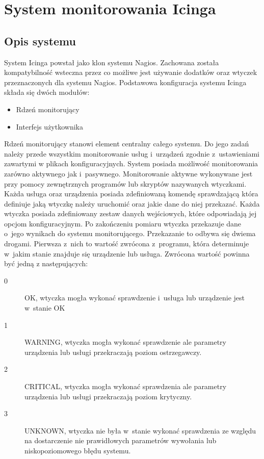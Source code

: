 \chapter{System monitorowania Icinga}
\label{chap:Icinga}

\section[Opis systemu][Opis systemu]{Opis systemu}

System Icinga powstał jako klon systemu Nagios. Zachowana została
kompatybilność wsteczna przez co możliwe jest używanie dodatków oraz
wtyczek przeznaczonych dla systemu Nagios. Podstawowa konfiguracja
systemu Icinga składa się dwóch modułów:

\begin{itemize}
\item Rdzeń monitorujący
\item Interfejs użytkownika
\end{itemize}

Rdzeń monitorujący stanowi element centralny całego systemu. Do jego
zadań należy przede wszystkim monitorowanie usług i~urządzeń zgodnie
z~ustawieniami zawartymi w plikach konfiguracyjnych. System posiada
możliwość monitorowania zarówno aktywnego jak
i~pasywnego. Monitorowanie aktywne wykonywane jest przy pomocy
zewnętrznych programów lub skryptów nazywanych wtyczkami. Każda usługa
oraz urządzenia posiada zdefiniowaną komendę sprawdzającą która
definiuje jaką wtyczkę należy uruchomić oraz jakie dane do niej
przekazać. Każda wtyczka posiada zdefiniowany zestaw danych
wejściowych, które odpowiadają jej opcjom konfiguracyjnym. Po
zakończeniu pomiaru wtyczka przekazuje dane o~jego wynikach do systemu
monitorującego. Przekazanie to odbywa się dwiema drogami. Pierwsza
z~nich to wartość zwrócona z~programu, która determinuje w~jakim
stanie znajduje się urządzenie lub usługa. Zwrócona wartość powinna
być jedną z następujących:

\begin{description}
\item[0] OK, wtyczka mogła wykonać sprawdzenie i~usługa lub urządzenie
  jest w~stanie OK
\item[1] WARNING, wtyczka mogła wykonać sprawdzenie ale parametry
  urządzenia lub usługi przekraczają poziom ostrzegawczy.
\item[2] CRITICAL, wtyczka mogła wykonać sprawdzenia ale parametry
  urządzenia lub usługi przekraczają poziom krytyczny.
\item[3] UNKNOWN, wtyczka nie była w~stanie wykonać sprawdzenia ze
  względu na dostarczenie nie prawidłowych parametrów wywołania lub
  niskopoziomowego błędu systemu.
\end{description}

